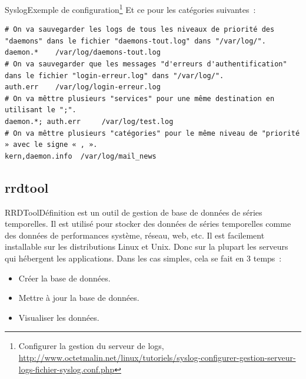 \documentclass{beamer}
\begin{document}
    \begin{frame}[fragile]{Syslog}{Exemple de configuration\footnote{Configurer la gestion du serveur de logs, \url{http://www.octetmalin.net/linux/tutoriels/syslog-configurer-gestion-serveur-logs-fichier-syslog.conf.php}}}
        Et ce pour les catégories suivantes~:
        \begin{lstlisting}
# On va sauvegarder les logs de tous les niveaux de priorité des "daemons" dans le fichier "daemons-tout.log" dans "/var/log/".
daemon.*	/var/log/daemons-tout.log
# On va sauvegarder que les messages "d'erreurs d'authentification" dans le fichier "login-erreur.log" dans "/var/log/".
auth.err	/var/log/login-erreur.log
# On va mêttre plusieurs "services" pour une même destination en utilisant le ";".
daemon.*; auth.err     /var/log/test.log
# On va mêttre plusieurs "catégories" pour le même niveau de "priorité » avec le signe « , ».
kern,daemon.info  /var/log/mail_news
        \end{lstlisting}
    \end{frame}

    \subsection{rrdtool}\label{subsec:rrdtool}

    \begin{frame}{RRDTool}{Définition}
         est un outil de gestion de base de données de séries temporelles.
        \bigbreak
        Il est utilisé pour stocker des données de séries temporelles comme des données de performances système, réseau, web, etc.
        \bigbreak
        Il est facilement installable sur les distributions Linux et Unix.
        Donc sur la plupart les serveurs qui hébergent les applications.
        \bigbreak
        Dans les cas simples, cela se fait en 3 temps~:
        \begin{itemize}
            \item Créer la base de données.
            \item Mettre à jour la base de données.
            \item Visualiser les données.
        \end{itemize}
    \end{frame}
\end{document}
